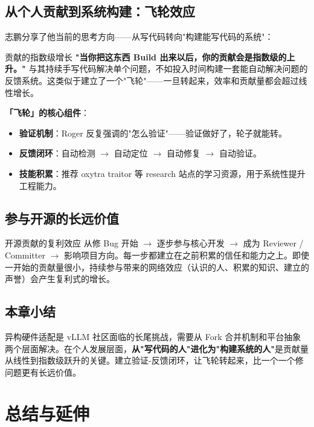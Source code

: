 \documentclass[a4paper]{article}
\begin{document}
\subsection{从个人贡献到系统构建：飞轮效应}

志鹏分享了他当前的思考方向——从写代码转向"构建能写代码的系统"：

\begin{importantbox}{贡献的指数级增长}
\textbf{"当你把这东西 Build 出来以后，你的贡献会是指数级的上升。"} 与其持续手写代码解决单个问题，不如投入时间构建一套能自动解决问题的反馈系统。这类似于建立了一个"飞轮"——一旦转起来，效率和贡献量都会超过线性增长。
\end{importantbox}

\textbf{「飞轮」的核心组件}：

\begin{itemize}
\item \textbf{验证机制}：Roger 反复强调的"怎么验证"——验证做好了，轮子就能转。
\item \textbf{反馈闭环}：自动检测 $\rightarrow$ 自动定位 $\rightarrow$ 自动修复 $\rightarrow$ 自动验证。
\item \textbf{技能积累}：推荐 oxytra traitor 等 research 站点的学习资源，用于系统性提升工程能力。
\end{itemize}

\subsection{参与开源的长远价值}

\begin{knowledgebox}{开源贡献的复利效应}
从修 Bug 开始 $\rightarrow$ 逐步参与核心开发 $\rightarrow$ 成为 Reviewer / Committer $\rightarrow$ 影响项目方向。每一步都建立在之前积累的信任和能力之上。即使一开始的贡献量很小，持续参与带来的网络效应（认识的人、积累的知识、建立的声誉）会产生复利式的增长。
\end{knowledgebox}

\subsection{本章小结}

异构硬件适配是 vLLM 社区面临的长尾挑战，需要从 Fork 合并机制和平台抽象两个层面解决。在个人发展层面，\textbf{从"写代码的人"进化为"构建系统的人"}是贡献量从线性到指数级跃升的关键。建立验证-反馈闭环，让飞轮转起来，比一个一个修问题更有长远价值。

\newpage
\section{总结与延伸}
\end{document}
